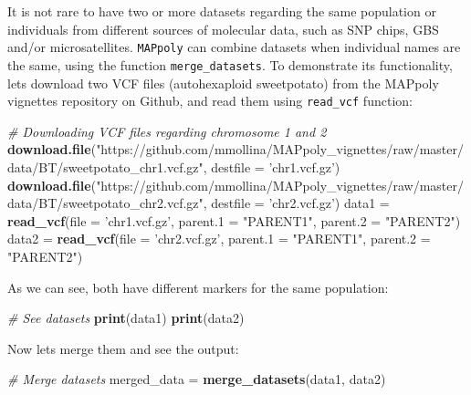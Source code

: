 \documentclass[
]{article}
\newenvironment{Shaded}{}{}
\newcommand{\CommentTok}[1]{\textcolor[rgb]{0.38,0.63,0.69}{\textit{#1}}}
\newcommand{\DataTypeTok}[1]{\textcolor[rgb]{0.56,0.13,0.00}{#1}}
\newcommand{\KeywordTok}[1]{\textcolor[rgb]{0.00,0.44,0.13}{\textbf{#1}}}
\newcommand{\NormalTok}[1]{#1}
\newcommand{\StringTok}[1]{\textcolor[rgb]{0.25,0.44,0.63}{#1}}
\begin{document}
It is not rare to have two or more datasets regarding the same
population or individuals from different sources of molecular data, such
as SNP chips, GBS and/or microsatellites. \texttt{MAPpoly} can combine
datasets when individual names are the same, using the function
\texttt{merge\_datasets}. To demonstrate its functionality, lets
download two VCF files (autohexaploid sweetpotato) from the MAPpoly
vignettes repository on Github, and read them using \texttt{read\_vcf}
function:

\begin{Shaded}
\begin{Highlighting}[]
\CommentTok{# Downloading VCF files regarding chromosome 1 and 2}
\KeywordTok{download.file}\NormalTok{(}\StringTok{"https://github.com/mmollina/MAPpoly_vignettes/raw/master/data/BT/sweetpotato_chr1.vcf.gz"}\NormalTok{, }\DataTypeTok{destfile =} \StringTok{'chr1.vcf.gz'}\NormalTok{)}
\KeywordTok{download.file}\NormalTok{(}\StringTok{"https://github.com/mmollina/MAPpoly_vignettes/raw/master/data/BT/sweetpotato_chr2.vcf.gz"}\NormalTok{, }\DataTypeTok{destfile =} \StringTok{'chr2.vcf.gz'}\NormalTok{)}
\NormalTok{data1 =}\StringTok{ }\KeywordTok{read_vcf}\NormalTok{(}\DataTypeTok{file =} \StringTok{'chr1.vcf.gz'}\NormalTok{, }\DataTypeTok{parent.1 =} \StringTok{"PARENT1"}\NormalTok{, }\DataTypeTok{parent.2 =} \StringTok{"PARENT2"}\NormalTok{)}
\NormalTok{data2 =}\StringTok{ }\KeywordTok{read_vcf}\NormalTok{(}\DataTypeTok{file =} \StringTok{'chr2.vcf.gz'}\NormalTok{, }\DataTypeTok{parent.1 =} \StringTok{"PARENT1"}\NormalTok{, }\DataTypeTok{parent.2 =} \StringTok{"PARENT2"}\NormalTok{)}
\end{Highlighting}
\end{Shaded}

As we can see, both have different markers for the same population:

\begin{Shaded}
\begin{Highlighting}[]
\CommentTok{# See datasets}
\KeywordTok{print}\NormalTok{(data1)}
\KeywordTok{print}\NormalTok{(data2)}
\end{Highlighting}
\end{Shaded}

Now lets merge them and see the output:

\begin{Shaded}
\begin{Highlighting}[]
\CommentTok{# Merge datasets}
\NormalTok{merged_data =}\StringTok{ }\KeywordTok{merge_datasets}\NormalTok{(data1, data2)}
\end{Highlighting}
\end{Shaded}
\end{document}
